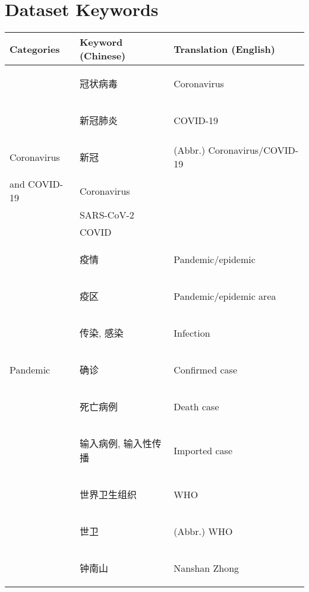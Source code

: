 \documentclass [11pt, proquest] {uwthesis}[2020/02/24]
\begin{document}
\chapter{Dataset Keywords}
\begin{longtable}{ p{3cm}p{5cm}p{8cm} }
 \hline
 Categories& Keyword (Chinese) & Translation (English)\\
 \hline
 & \begin{CJK*}{UTF8}{gbsn}冠状病毒 \end{CJK*}&Coronavirus\\
 & \begin{CJK*}{UTF8}{gbsn}新冠肺炎 \end{CJK*}&COVID-19\\
 Coronavirus & \begin{CJK*}{UTF8}{gbsn}新冠 \end{CJK*}&(Abbr.) Coronavirus/COVID-19\\
 and COVID-19&Coronavirus&\\
 &SARS-CoV-2&\\
 &COVID&\\
  \hline
  &\begin{CJK*}{UTF8}{gbsn}疫情 \end{CJK*}&Pandemic/epidemic\\
  &\begin{CJK*}{UTF8}{gbsn}疫区 \end{CJK*}&Pandemic/epidemic area\\
&\begin{CJK*}{UTF8}{gbsn}传染, 感染 \end{CJK*}&Infection\\
Pandemic&\begin{CJK*}{UTF8}{gbsn}确诊 \end{CJK*}&Confirmed case\\
&\begin{CJK*}{UTF8}{gbsn}死亡病例 \end{CJK*}&Death case\\
&\begin{CJK*}{UTF8}{gbsn}输入病例, 输入性传播 \end{CJK*}&Imported case\\
  \hline
&\begin{CJK*}{UTF8}{gbsn}世界卫生组织 \end{CJK*}&WHO\\
&\begin{CJK*}{UTF8}{gbsn}世卫\end{CJK*}&(Abbr.) WHO\\
&\begin{CJK*}{UTF8}{gbsn}钟南山\end{CJK*}&Nanshan Zhong\\

\end{longtable}
\end{document}
